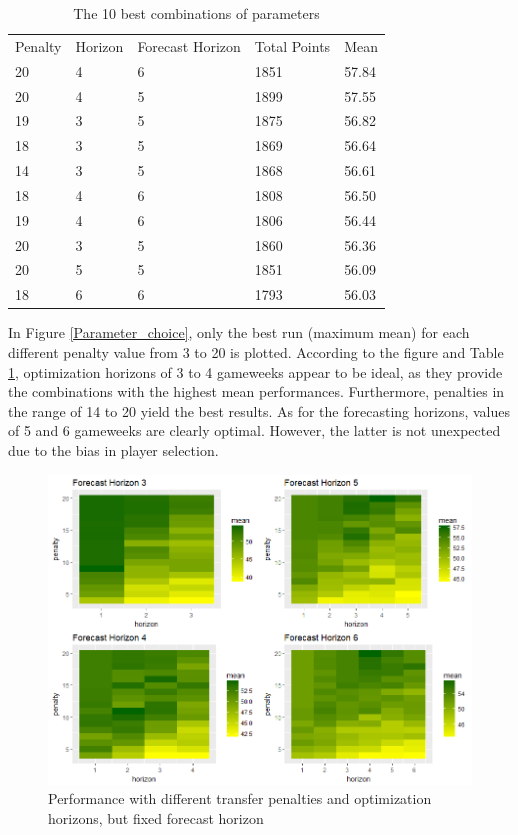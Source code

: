 \begin{table}[H]
\centering
\caption{The 10 best combinations of parameters}
\label{tab:top_10}
\begin{tabular}{lllll}
Penalty & Horizon & Forecast Horizon & Total Points & Mean  \\
20      & 4       & 6                & 1851         & 57.84 \\
20      & 4       & 5                & 1899         & 57.55 \\
19      & 3       & 5                & 1875         & 56.82 \\
18      & 3       & 5                & 1869         & 56.64 \\
14      & 3       & 5                & 1868         & 56.61 \\
18      & 4       & 6                & 1808         & 56.50 \\
19      & 4       & 6                & 1806         & 56.44 \\
20      & 3       & 5                & 1860         & 56.36 \\
20      & 5       & 5                & 1851         & 56.09 \\
18      & 6       & 6                & 1793         & 56.03
\end{tabular}
\end{table}


In Figure \ref{Parameter_choice}, only the best run (maximum mean) for each different penalty value from 3 to 20 is plotted. According to the figure and Table \ref{tab:top_10}, optimization horizons of 3 to 4 gameweeks appear to be ideal, as they provide the combinations with the highest mean performances. Furthermore, penalties in the range of 14 to 20 yield the best results. As for the forecasting horizons, values of 5 and 6 gameweeks are clearly optimal. However, the latter is not unexpected due to the bias in player selection. 

\begin{figure}[H]
    \centering
    \includegraphics[scale=0.55]{fig/chapter_6/parameter_choice_fixed_f_hor.png}
    \caption{Performance with different transfer penalties and optimization horizons, but fixed forecast horizon}
\label{fig:fixed_f_hor}    
\end{figure}

